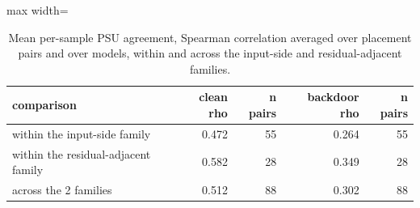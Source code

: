 \begin{table}[htbp]
\centering
\small
\caption{Mean per-sample PSU agreement, Spearman correlation averaged over placement pairs and over models, within and across the input-side and residual-adjacent families.}
\label{tab:mech-operator-agreement-family}
\begin{adjustbox}{max width=\linewidth}
\begin{tabular}{lrrrr}
\toprule
comparison & clean rho & n pairs & backdoor rho & n pairs \\
\midrule
within the input-side family & 0.472 & 55 & 0.264 & 55 \\
within the residual-adjacent family & 0.582 & 28 & 0.349 & 28 \\
across the 2 families & 0.512 & 88 & 0.302 & 88 \\
\bottomrule
\end{tabular}
\end{adjustbox}
\end{table}
